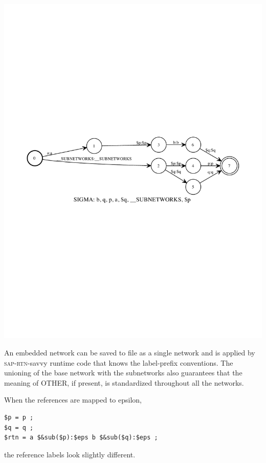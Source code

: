 \documentclass[letterpaper,12pt]{article}
\newcommand{\acro}{\textsc}
\begin{document}
\begin{center}
\includegraphics[width=\textwidth]{images/sapEmbedded.pdf}
\end{center}

\noindent
An embedded network can be saved to file as a single network and is
applied by \acro{sap}-\acro{rtn}-savvy runtime code that knows the label-prefix
conventions.  
The unioning of the base network with the subnetworks also guarantees that
the meaning of OTHER, if present, is standardized throughout all the
networks.

When the references are mapped to epsilon, 

\begin{Verbatim}[fontsize=\small]
$p = p ;
$q = q ;
$rtn = a $&sub($p):$eps b $&sub($q):$eps ;
\end{Verbatim}

\noindent
the reference labels look slightly different.
\end{document}
